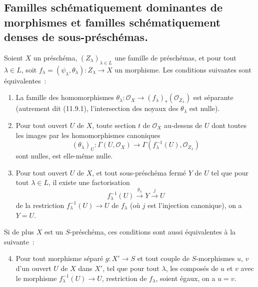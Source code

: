 \subsection{Familles schématiquement dominantes de morphismes et familles
schématiquement denses de sous-préschémas.}
\label{subsection:IV.11.10-fr}

\begin{proposition}[11.10.1]
\label{IV.11.10.1-fr}
Soient $X$ un préschéma, $(Z_\lambda)_{\lambda\in L}$ une famille de
préschémas, et pour tout $\lambda\in L$, soit
$f_\lambda=(\psi_\lambda,\theta_\lambda):Z_\lambda\to X$ un morphisme. Les
conditions suivantes sont équivalentes~:
\begin{enumerate}[label=\emph{\alph*)}]
  \item La famille des homomorphismes
  $\theta_\lambda:\mathcal O_X\to(f_\lambda)_*(\mathcal O_{Z_\lambda})$ est
  séparante \textup{(autrement dit (11.9.1), l'intersection des noyaux des
  $\theta_\lambda$ est} nulle\textup{)}.
  \item Pour tout ouvert $U$ de $X$, toute section $t$ de $\mathcal O_X$
  au-dessus de $U$ dont toutes les images par les homomorphismes canoniques
  \[
  (\theta_\lambda)_U:\Gamma(U,\mathcal O_X)
  \longrightarrow\Gamma(f_\lambda^{-1}(U),\mathcal O_{Z_\lambda})
  \tag{11.10.1.1}
  \label{IV.11.10.1.1-fr}
  \]
  sont nulles, est elle-même nulle.
  \item Pour tout ouvert $U$ de $X$, et tout sous-préschéma fermé $Y$ de $U$
  tel que pour tout $\lambda\in L$, il existe une factorisation
  \[
  f_\lambda^{-1}(U)\xrightarrow{g_\lambda}Y\xrightarrow{j}U
  \tag{11.10.1.2}
  \label{IV.11.10.1.2-fr}
  \]
  de la restriction $f_\lambda^{-1}(U)\to U$ de $f_\lambda$ \textup{(où $j$ est
  l'injection canonique)}, on a $Y=U$.
\end{enumerate}

Si de plus $X$ est un $S$-préschéma, ces conditions sont aussi équivalentes à
la suivante~:
\begin{enumerate}[label=\emph{\alph*)}]
\setcounter{enumi}{3}
  \item Pour tout morphisme séparé $g:X'\to S$ et tout couple de
  $S$-morphismes $u$, $v$ d'un ouvert $U$ de $X$ dans $X'$, tel que pour tout
  $\lambda$, les composés de $u$ et $v$ avec le morphisme
  $f_\lambda^{-1}(U)\to U$, restriction de $f_\lambda$, soient égaux, on a
  $u=v$.
\end{enumerate}
\end{proposition}

